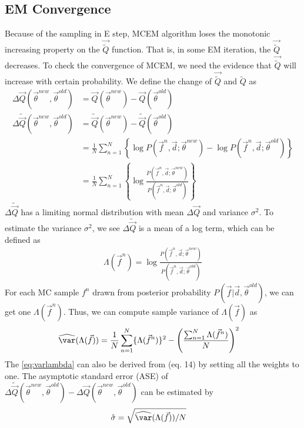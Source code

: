 \documentclass[12pt]{article}
\begin{document}
\subsection{EM Convergence}
Because of the sampling in E step, MCEM algorithm loses the monotonic
increasing property on the $\vec {\tilde Q}$ function. That is, in
some EM iteration, the $\vec {\tilde Q}$ decreases. To check the
convergence of MCEM, we need the evidence that $\vec {\tilde Q}$ will
increase with certain probability. We define the change of $\vec {\tilde Q}$ and $ {\tilde Q}$ as 
\begin{align*}
 \Delta {\vec Q}(\vec \theta^{new}, \vec \theta^{old}) &= {\vec Q}(\vec \theta^{new}) - {\vec Q}(\vec \theta^{old})\\
 \Delta \widetilde {\vec Q}(\vec \theta^{new}, \vec \theta^{old}) &= \widetilde {\vec Q}(\vec \theta^{new}) - \widetilde {\vec Q}(\vec \theta^{old}) \\
 &= \frac{1}{N}\sum_{n=1}^{N}\left \{ \log P(\vec f^n, \vec d; \vec \theta^{new}) - \log P(\vec f^n, \vec d; \vec \theta^{old})\right \}\\
 &= \frac{1}{N}\sum_{n=1}^{N}\left \{ \log \frac{P(\vec f^n, \vec d; \vec \theta^{new})}{ P(\vec f^n, \vec d; \vec \theta^{old})}\right \}
\end{align*}
$ \Delta \widetilde {\vec Q}$ has a limiting normal distribution with
mean $\Delta {\vec Q}$ and variance $\sigma^2$. To estimate the
variance $\sigma^2$, we see $ \Delta \widetilde {\vec Q}$ is a mean of
a log term, which can be defined as
\begin{align*}
  \Lambda (\vec f^n) = \log \frac{P(\vec f^n, \vec d; \vec \theta^{new})}{ P(\vec f^n, \vec d; \vec \theta^{old})} 
\end{align*}
For each MC sample $f^n$ drawn from posterior probability $P(\vec f| \vec d, \vec \theta^{old})$, we can get one $\Lambda(\vec f^n)$. Thus, we can compute sample variance of $\Lambda(\vec f)$ as
\begin{align}
\widehat  \var(\Lambda(\vec f)) &= \frac{1}{N}\sum_{n = 1}^{N}\{\Lambda(\vec f^n)\}^2 - \left (\frac{\sum_{n=1}^{N} \Lambda(\vec f^n)}{N} \right )^2 
\label{eq:varlambda}
\end{align}
The \eqref{eq:varlambda} can also be derived from \citet{caffo2005ascent} (eq. 14) by setting all the weights to one. The asymptotic standard error (ASE) of $ \Delta \widetilde {\vec Q}(\vec \theta^{new}, \vec \theta^{old}) -  \Delta {\vec Q}(\vec \theta^{new}, \vec \theta^{old})$ can be estimated by 
\begin{align*}
  \hat \sigma &= \sqrt{\widehat  \var(\Lambda(\vec f))/N}
\end{align*}
\end{document}
